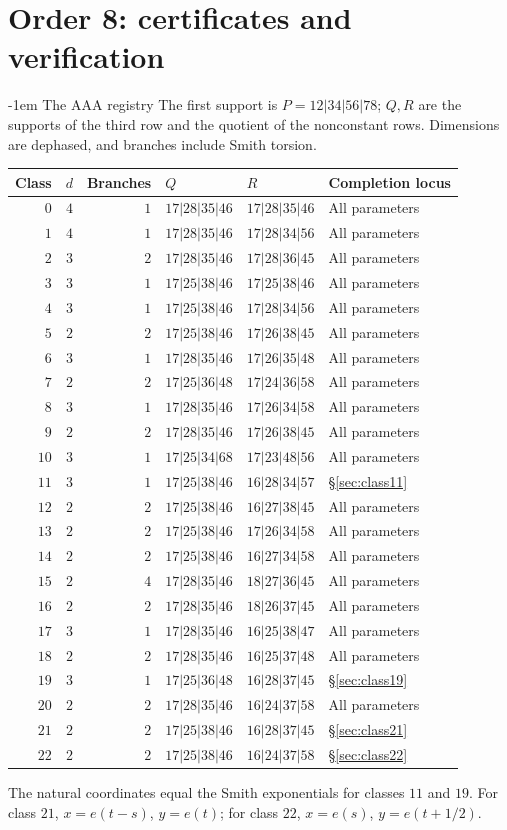 \documentclass[11pt,a4paper]{article}
\makeatletter
\theoremstyle{plain}
\theoremstyle{definition}
\numberwithin{equation}{section}
\renewcommand\subsection{\@startsection{subsection}{2}{\z@}  {\medskipamount}  {-1em}  {\normalfont\normalsize\bfseries}}
\makeatother
\begin{document}
\section{Order 8: certificates and verification}\label{sec:N8part4}
\subsection{The AAA registry}\label{app:registry}
The first support is $P=12|34|56|78$; $Q,R$ are the supports of the third row and the quotient of the nonconstant rows. Dimensions are dephased, and branches include Smith torsion.
\begin{longtable}{rrrlll}\toprule Class&$d$&Branches&$Q$&$R$&Completion locus\\\midrule\endhead
$0$&$4$&$1$&$17|28|35|46$&$17|28|35|46$&All parameters\\
$1$&$4$&$1$&$17|28|35|46$&$17|28|34|56$&All parameters\\
$2$&$3$&$2$&$17|28|35|46$&$17|28|36|45$&All parameters\\
$3$&$3$&$1$&$17|25|38|46$&$17|25|38|46$&All parameters\\
$4$&$3$&$1$&$17|25|38|46$&$17|28|34|56$&All parameters\\
$5$&$2$&$2$&$17|25|38|46$&$17|26|38|45$&All parameters\\
$6$&$3$&$1$&$17|28|35|46$&$17|26|35|48$&All parameters\\
$7$&$2$&$2$&$17|25|36|48$&$17|24|36|58$&All parameters\\
$8$&$3$&$1$&$17|28|35|46$&$17|26|34|58$&All parameters\\
$9$&$2$&$2$&$17|28|35|46$&$17|26|38|45$&All parameters\\
$10$&$3$&$1$&$17|25|34|68$&$17|23|48|56$&All parameters\\
$11$&$3$&$1$&$17|25|38|46$&$16|28|34|57$&\S\ref{sec:class11}\\
$12$&$2$&$2$&$17|25|38|46$&$16|27|38|45$&All parameters\\
$13$&$2$&$2$&$17|25|38|46$&$17|26|34|58$&All parameters\\
$14$&$2$&$2$&$17|25|38|46$&$16|27|34|58$&All parameters\\
$15$&$2$&$4$&$17|28|35|46$&$18|27|36|45$&All parameters\\
$16$&$2$&$2$&$17|28|35|46$&$18|26|37|45$&All parameters\\
$17$&$3$&$1$&$17|28|35|46$&$16|25|38|47$&All parameters\\
$18$&$2$&$2$&$17|28|35|46$&$16|25|37|48$&All parameters\\
$19$&$3$&$1$&$17|25|36|48$&$16|28|37|45$&\S\ref{sec:class19}\\
$20$&$2$&$2$&$17|28|35|46$&$16|24|37|58$&All parameters\\
$21$&$2$&$2$&$17|25|38|46$&$16|28|37|45$&\S\ref{sec:class21}\\
$22$&$2$&$2$&$17|25|38|46$&$16|24|37|58$&\S\ref{sec:class22}\\
\bottomrule\end{longtable}
The natural coordinates equal the Smith exponentials for classes $11$ and $19$. For class $21$, $x=e(t-s)$, $y=e(t)$; for class $22$, $x=e(s)$, $y=e(t+1/2)$.
\end{document}
